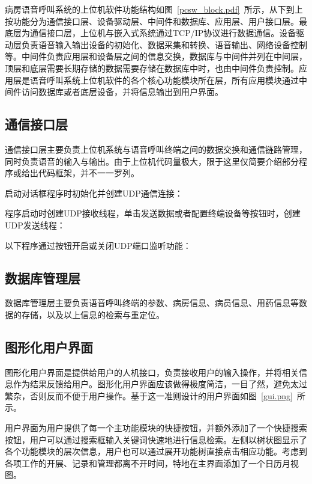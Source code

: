 病房语音呼叫系统的上位机软件功能结构如图~\ref{pcsw_block.pdf}~所示，从下到上按功能分为通信接口层、设备驱动层、中间件和数据库、应用层、用户接口层。最底层为通信接口层，上位机与嵌入式系统通过TCP/IP协议进行数据通信。设备驱动层负责语音输入输出设备的初始化、数据采集和转换、语音输出、网络设备控制等。中间件负责应用层和设备层之间的信息交换，数据库与中间件并列在中间层，顶层和底层需要长期存储的数据需要存储在数据库中时，也由中间件负责控制。应用层是语音呼叫系统上位机软件的各个核心功能模块所在层，所有应用模块通过中间件访问数据库或者底层设备，并将信息输出到用户界面。

\subsection{通信接口层}
通信接口层主要负责上位机系统与语音呼叫终端之间的数据交换和通信链路管理，同时负责语音的输入与输出。由于上位机代码量极大，限于这里仅简要介绍部分程序或给出代码框架，并不一一罗列。

启动对话框程序时初始化并创建UDP通信连接：


程序启动时创建UDP接收线程，单击发送数据或者配置终端设备等按钮时，创建UDP发送线程：


以下程序通过按钮开启或关闭UDP端口监听功能：


\subsection{数据库管理层}
数据库管理层主要负责语音呼叫终端的参数、病房信息、病员信息、用药信息等数据的存储，以及以上信息的检索与重定位。

\subsection{图形化用户界面}
图形化用户界面是提供给用户的人机接口，负责接收用户的输入操作，并将相关信息作为结果反馈给用户。图形化用户界面应该做得极度简洁，一目了然，避免太过繁杂，否则反而不便于用户操作。基于这一准则设计的用户界面如图~\ref{gui.png}~所示。

用户界面为用户提供了每一个主功能模块的快捷按钮，并额外添加了一个快捷搜索按钮，用户可以通过搜索框输入关键词快速地进行信息检索。左侧以树状图显示了各个功能模块的层次信息，用户也可以通过展开功能树直接点击相应功能。考虑到各项工作的开展、记录和管理都离不开时间，特地在主界面添加了一个日历月视图。

